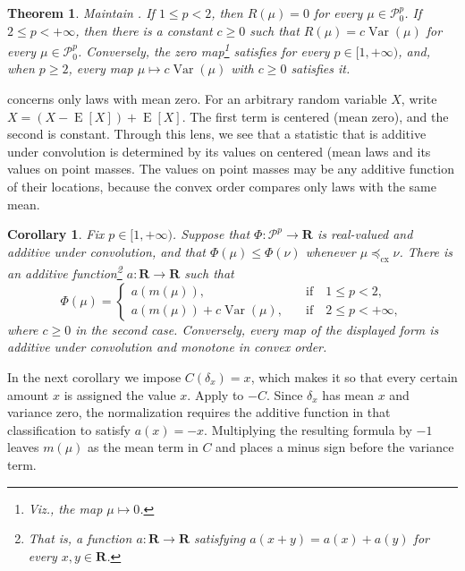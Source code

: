 \documentclass[11pt]{amsart}
\theoremstyle{plain}
\newtheorem{theorem}{Theorem}
\newtheorem{corollary}{Corollary}
\theoremstyle{definition}
\theoremstyle{remark}
\numberwithin{equation}{section}
\newcommand{\1}{\mathbf 1}
\begin{document}
\begin{theorem}\label{thm:second-moment-dichotomy}
Maintain . If \(1\leq p<2\), then \(R(\mu)=0\) for every \(\mu\in\mathcal P_0^p\). If \(2\leq p<+\infty\), then there is a constant \(c\geq0\) such that \(R(\mu)=c\operatorname{Var}(\mu)\) for every \(\mu\in\mathcal P_0^p\). Conversely, the zero map\footnote{\textit{Viz.}, the map \(\mu\mapsto0\).} satisfies  for every \(p\in[1,+\infty)\), and, when \(p\geq2\), every map \(\mu\mapsto c\operatorname{Var}(\mu)\) with \(c\geq0\) satisfies it.\end{theorem}
 concerns only laws with mean zero. For an arbitrary random variable \(X\), write \(X=\left(X-\operatorname{E}[X]\right)+\operatorname{E}[X]\). The first term is centered (mean zero), and the second is constant. Through this lens, we see that a statistic that is additive under convolution is determined by its values on centered (mean  laws and its values on point masses. The values on point masses may be any additive function of their locations, because the convex order compares only laws with the same mean.

\begin{corollary}\label{cor:full-classification}
Fix \(p\in[1,+\infty)\). Suppose that \(\Phi\colon\mathcal P^p\to\mathbf R\) is real-valued and additive under convolution, and that \(\Phi(\mu)\leq\Phi(\nu)\) whenever \(\mu\preceq_{\mathrm{cx}}\nu\). There is an additive function\footnote{That is, a function \(a\colon\mathbf R\to\mathbf R\) satisfying \(a(x+y)=a(x)+a(y)\) for every \(x,y\in\mathbf R\).} \(a\colon\mathbf R\to\mathbf R\) such that
\[
\Phi(\mu)=
\begin{cases}
a(m(\mu)), \quad &\text{if} \quad 1\leq p<2,\\
a(m(\mu))+c\operatorname{Var}(\mu),\quad &\text{if} \quad 2\leq p<+\infty,
\end{cases}
\]
where \(c\geq0\) in the second case. Conversely, every map of the displayed form is additive under convolution and monotone in convex order.
\end{corollary}

In the next corollary we impose \(C(\delta_x)=x\), which makes it so that every certain amount \(x\) is assigned the value \(x\). Apply  to \(-C\). Since \(\delta_x\) has mean \(x\) and variance zero, the normalization requires the additive function in that classification to satisfy \(a(x)=-x\). Multiplying the resulting formula by \(-1\) leaves \(m(\mu)\) as the mean term in \(C\) and places a minus sign before the variance term.
\end{document}
